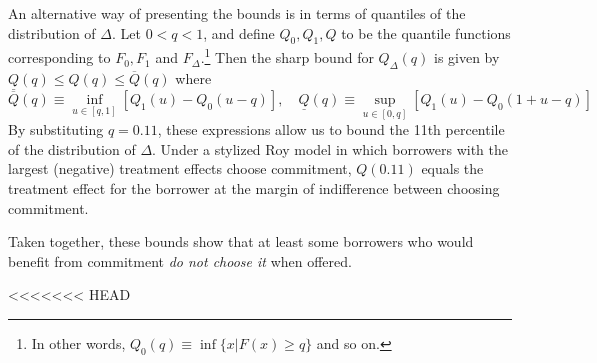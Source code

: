 \documentclass[oneside,11pt]{article}
\begin{document}
An alternative way of presenting the \cite{fan2010sharp} bounds is in terms of quantiles of the distribution of $\Delta$. Let $0 < q < 1$, and define $Q_0, Q_1, Q$ to be the quantile functions corresponding to $F_0, F_1$ and $F_\Delta$.\footnote{In other words, $Q_0(q) \equiv \inf \{x | F(x) \geq q\}$ and so on.} Then the sharp bound for $Q_\Delta(q)$ is given by $\underline{Q}(q) \leq Q(q) \leq \overline{Q}(q)$ where
\[
\overline{Q}(q) \equiv \inf_{u \in [q,1]} [Q_1(u) - Q_0(u - q)], \quad
\underline{Q}(q) \equiv \sup_{u\in [0,q]} [Q_1(u) - Q_0(1 + u - q)]
\]
By substituting $q = 0.11$, these expressions allow us to bound the 11th percentile of the distribution of $\Delta$. Under a stylized Roy model in which borrowers with the largest (negative) treatment effects choose commitment, $Q(0.11)$ equals the treatment effect for the borrower at the margin of indifference between choosing commitment. 


Taken together, these bounds show that at least some borrowers who would benefit from commitment \emph{do not choose it} when offered. 




<<<<<<< HEAD
\end{document}
